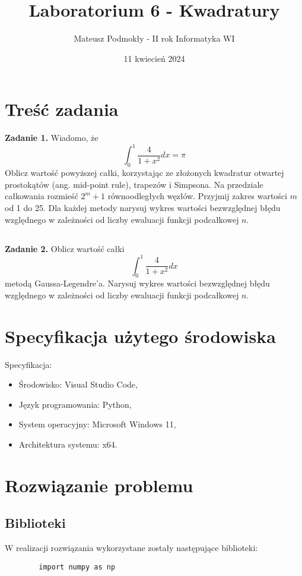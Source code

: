 \documentclass[11pt]{scrartcl}
\title{Laboratorium 6 - Kwadratury}
\author{Mateusz Podmokły - II rok Informatyka WI}
\date{11 kwiecień 2024}
\begin{document}
    \maketitle
    \section{Treść zadania}
    \textbf{Zadanie 1.} Wiadomo, że
    \[
        \int_{0}^{1}\frac{4}{1+x^2}dx=\pi
    \]
    Oblicz wartość powyższej całki, korzystając ze złożonych
    kwadratur otwartej prostokątów (ang. mid-point rule),
    trapezów i Simpsona. Na przedziale całkowania rozmieść
    $2^m+1$ równoodległych węzłów. Przyjmij zakres
    wartości $m$ od 1 do 25. Dla każdej metody narysuj wykres
    wartości bezwzględnej błędu względnego w zależności od
    liczby ewaluacji funkcji podcałkowej $n$.
    \subsection*{}
    \textbf{Zadanie 2.} Oblicz wartość całki
    \[
        \int_{0}^{1}\frac{4}{1+x^2}dx
    \]
    metodą Gaussa-Legendre'a. Narysuj wykres wartości bezwzględnej
    błędu względnego w zależności od liczby ewaluacji funkcji
    podcałkowej $n$.

    \section{Specyfikacja użytego środowiska}
    Specyfikacja:

    \begin{itemize}
        \item Środowisko: Visual Studio Code,
        \item Język programowania: Python,
        \item System operacyjny: Microsoft Windows 11,
        \item Architektura systemu: x64.
    \end{itemize}

    \section{Rozwiązanie problemu}
    \subsection{Biblioteki}
    W realizacji rozwiązania wykorzystane zostały następujące
    biblioteki:
    \begin{lstlisting}
        import numpy as np
    \end{lstlisting}
\end{document}
